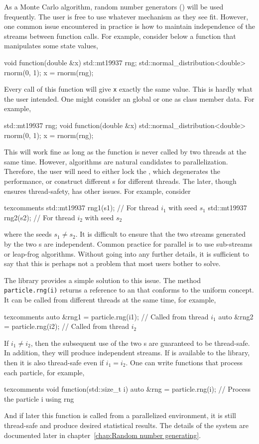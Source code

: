 As a Monte Carlo algorithm, random number generators (\rng) will be used
frequently. The user is free to use whatever \rng mechanism as they see fit.
However, one common issue encountered in practice is how to maintain
independence of the \rng streams between function calls. For example, consider
below a function that manipulates some state values,
\begin{cppcode}
  void function(double &x)
  {
      std::mt19937 rng;
      std::normal_distribution<double> rnorm(0, 1);
      x = rnorm(rng);
  }
\end{cppcode}
Every call of this function will give \verb|x| exactly the same value. This is
hardly what the user intended. One might consider an global \rng or one as
class member data. For example,
\begin{cppcode}
  std::mt19937 rng;
  void function(double &x)
  {
      std::normal_distribution<double> rnorm(0, 1);
      x = rnorm(rng);
  }
\end{cppcode}
This will work fine as long as the function is never called by two threads at
the same time. However, \smc algorithms are natural candidates to
parallelization. Therefore, the user will need to either lock the \rng, which
degenerates the performance, or construct different \rng{}s for different
threads. The later, though ensures thread-safety, has other issues. For
example, consider
\begin{cppcode*}{texcomments}
  std::mt19937 rng1(s1); // For thread $i_1$ with seed $s_1$
  std::mt19937 rng2(s2); // For thread $i_2$ with seed $s_2$
\end{cppcode*}
where the seeds $s_1 \ne s_2$. It is difficult to ensure that the two streams
generated by the two \rng{}s are independent. Common practice for parallel \rng
is to use sub-streams or leap-frog algorithms. Without going into any further
details, it is sufficient to say that this is perhaps not a problem that most
users bother to solve.

The library provides a simple solution to this issue. The method
\verb|particle.rng(i)| returns a reference to an \rng that conforms to the
\cppoo uniform \rng concept. It can be called from different threads at the
same time, for example,
\begin{cppcode*}{texcomments}
  auto &rng1 = particle.rng(i1); // Called from thread $i_1$
  auto &rng2 = particle.rng(i2); // Called from thread $i_2$
\end{cppcode*}
If $i_1 \ne i_2$, then the subsequent use of the two \rng{}s are guaranteed to
be thread-safe. In addition, they will produce independent streams. If \tbb is
available to the library, then it is also thread-safe even if $i_1 = i_2$. One
can write functions that process each particle, for example,
\begin{cppcode*}{texcomments}
  void function(std::size_t i)
  {
      auto &rng = particle.rng(i);
      // Process the particle i using rng
  }
\end{cppcode*}
And if later this function is called from a parallelized environment, it is
still thread-safe and produce desired statistical results. The details of the
\rng system are documented later in chapter~\ref{chap:Random number generating}.


